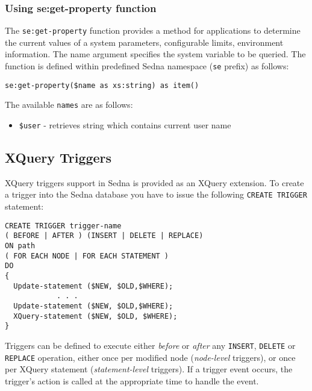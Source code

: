 \documentclass[a4paper,12pt]{article}
\begin{document}
\subsubsection*{Using se:get-property function}
The \verb!se:get-property! function provides a method for applications to determine the current values of a system parameters, configurable limits, environment information.
The name argument specifies the system variable to be queried. The function is defined within predefined Sedna namespace (\verb!se! prefix) as follows:

\begin{verbatim}
se:get-property($name as xs:string) as item()
\end{verbatim}

The available \verb!names! are as follows:

\begin{itemize}
\item \verb!$user! - retrieves string which contains current user name
\end{itemize}

\subsection{XQuery Triggers}

XQuery triggers support in Sedna is provided as an XQuery extension. To create a trigger into the Sedna database you have to issue the following \verb!CREATE TRIGGER! statement:

\begin{verbatim}
CREATE TRIGGER trigger-name
( BEFORE | AFTER ) (INSERT | DELETE | REPLACE)
ON path
( FOR EACH NODE | FOR EACH STATEMENT )
DO
{
  Update-statement ($NEW, $OLD,$WHERE);
            . . .
  Update-statement ($NEW, $OLD,$WHERE);
  XQuery-statement ($NEW, $OLD, $WHERE);
}
\end{verbatim}

Triggers can be defined to execute either \emph{before} or \emph{after} any \verb!INSERT!, \verb!DELETE! or \verb!REPLACE! operation, either once per modified node (\emph{node-level} triggers), or once per XQuery statement (\emph{statement-level} triggers). If a trigger event occurs, the trigger's action is called at the appropriate time to handle the event.
\end{document}
